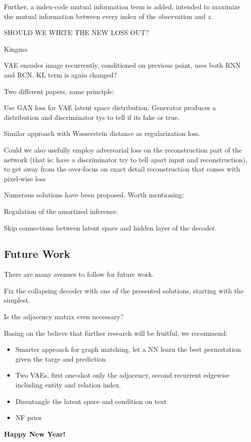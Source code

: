 Further, a index-code mutual information term is added, intended to maximize the mutual information between  every index of the observation and $z$.

SHOULD WE WIRTE THE NEW LOSS OUT?


Kingma 

VAE encodes image recurrently, conditioned on previous point, uses both RNN and RCN. KL term is again changed?


Two different papers, same principle:

Use GAN loss for VAE latent space distribution. Generator produces a distribution and discriminator tys to tell if its fake or true.

Similar approach with Wasserstein distance as regularization loss. 


Could we also usefully employ adversarial loss on the reconstruction part of the network (that is: have a discriminator try to tell apart input and reconstruction), to get away from the over-focus on exact detail reconstruction that comes with pixel-wise loss


Numerous solutions have been proposed. Worth mentioning:

Regulation of the amortized inference.

Skip connections between latent space and hidden layer of the decoder.




\subsection{Future Work}

There are many avenues to follow for future work.

Fix the collapsing decoder with one of the presented solutions, starting with the simplest.

Is the adjacency matrix even necessary? 

Basing on the believe that further research will be fruitful, we recommend:

\begin{itemize}
    \item Smarter approach for graph matching, let a NN learn the best permutation given the targe and prediction
    \item Two VAEs, first one-shot only the adjacency, second recurrent edgewise including entity and relation index.
    \item Disentangle the latent space and condition on text
    \item NF prior
\end{itemize}


\textbf{Happy New Year!}
